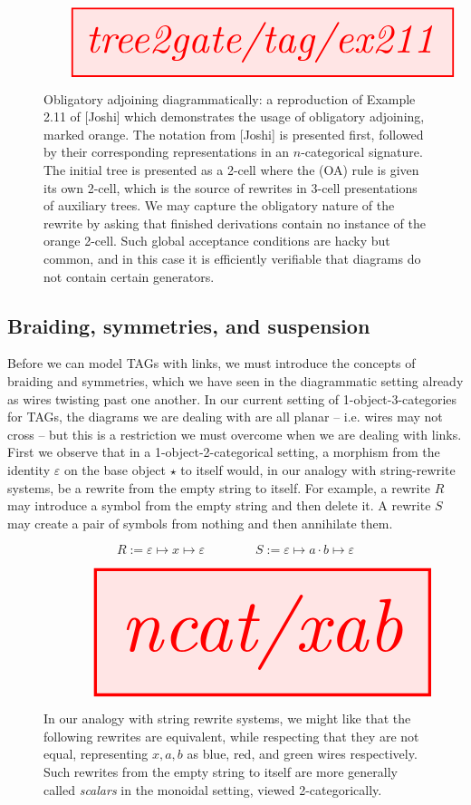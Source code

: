\begin{figure}[h!]
\centering
\[\resizebox{\textwidth}{!}{\tikzfig{tree2gate/tag/ex211}}\]
\caption{
Obligatory adjoining diagrammatically: a reproduction of Example 2.11 of [Joshi] which demonstrates the usage of obligatory adjoining, marked orange. The notation from [Joshi] is presented first, followed by their corresponding representations in an $n$-categorical signature. The initial tree is presented as a 2-cell where the (OA) rule is given its own 2-cell, which is the source of rewrites in 3-cell presentations of auxiliary trees. We may capture the obligatory nature of the rewrite by asking that finished derivations contain no instance of the orange 2-cell. Such global acceptance conditions are hacky but common, and in this case it is efficiently verifiable that diagrams do not contain certain generators.
}
\end{figure}



\subsection{Braiding, symmetries, and suspension}

Before we can model TAGs with links, we must introduce the concepts of braiding and symmetries, which we have seen in the diagrammatic setting already as wires twisting past one another. In our current setting of 1-object-3-categories for TAGs, the diagrams we are dealing with are all planar -- i.e. wires may not cross -- but this is a restriction we must overcome when we are dealing with links.\\

First we observe that in a 1-object-2-categorical setting, a morphism from the identity $\varepsilon$ on the base object $\star$ to itself would, in our analogy with string-rewrite systems, be a rewrite from the empty string to itself. For example, a rewrite $R$ may introduce a symbol from the empty string and then delete it. A rewrite $S$ may create a pair of symbols from nothing and then annihilate them.

\[R := \varepsilon \mapsto x \mapsto \varepsilon \quad\quad\quad\quad S := \varepsilon \mapsto a \cdot b \mapsto \varepsilon\]

\begin{figure}[h!]
\centering
\[\resizebox{\textwidth}{!}{\tikzfig{ncat/xab}}\]
\caption{
In our analogy with string rewrite systems, we might like that the following rewrites are equivalent, while respecting that they are not equal, representing $x,a,b$ as blue, red, and green wires respectively. Such rewrites from the empty string to itself are more generally called \emph{scalars} in the monoidal setting, viewed 2-categorically.
}
\end{figure}

